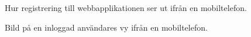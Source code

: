 \documentclass[a4paper,12pt]{article}
\begin{document}
 \begin{figure}[H]
   \centering
   \caption{Hur registrering till webbapplikationen ser ut ifrån en mobiltelefon.}
   \label{fig:mob_sign_up}
 \end{figure}

 \begin{figure}[H]
   \centering
   \caption{Bild på en inloggad användares vy ifrån en mobiltelefon.}
   \label{fig:mob_show_position}
 \end{figure}
\end{document}
